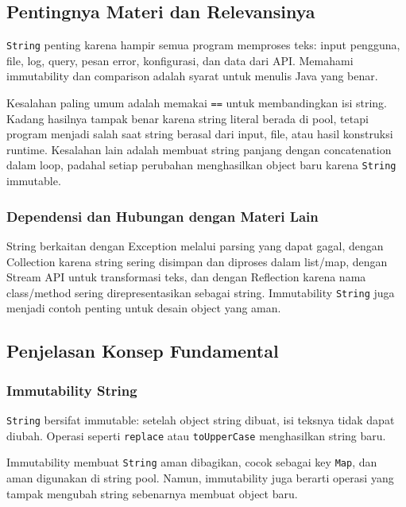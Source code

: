 \subsection{Pentingnya Materi dan Relevansinya}

\begin{jawab}
\texttt{String} penting karena hampir semua program memproses teks: input pengguna, file, log, query, pesan error, konfigurasi, dan data dari API. Memahami immutability dan comparison adalah syarat untuk menulis Java yang benar.
\end{jawab}

Kesalahan paling umum adalah memakai \texttt{==} untuk membandingkan isi string. Kadang hasilnya tampak benar karena string literal berada di pool, tetapi program menjadi salah saat string berasal dari input, file, atau hasil konstruksi runtime. Kesalahan lain adalah membuat string panjang dengan concatenation dalam loop, padahal setiap perubahan menghasilkan object baru karena \texttt{String} immutable.

\subsubsection{Dependensi dan Hubungan dengan Materi Lain}

String berkaitan dengan Exception melalui parsing yang dapat gagal, dengan Collection karena string sering disimpan dan diproses dalam list/map, dengan Stream API untuk transformasi teks, dan dengan Reflection karena nama class/method sering direpresentasikan sebagai string. Immutability \texttt{String} juga menjadi contoh penting untuk desain object yang aman.

\subsection{Penjelasan Konsep Fundamental}

\subsubsection{Immutability String}

\begin{jawab}
\texttt{String} bersifat immutable: setelah object string dibuat, isi teksnya tidak dapat diubah. Operasi seperti \texttt{replace} atau \texttt{toUpperCase} menghasilkan string baru.
\end{jawab}

Immutability membuat \texttt{String} aman dibagikan, cocok sebagai key \texttt{Map}, dan aman digunakan di string pool. Namun, immutability juga berarti operasi yang tampak mengubah string sebenarnya membuat object baru.

